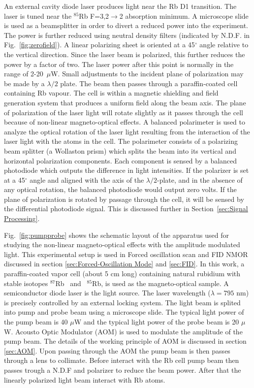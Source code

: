   An external cavity diode laser produces light near the Rb D1 transition.  The laser is tuned near the $^{85}$Rb F=3,2$\rightarrow$2 absorption minimum.  A microscope slide is used as a beamsplitter in order to divert a reduced power into the experiment.  The power is further reduced using neutral density filters (indicated by N.D.F. in Fig.~\ref{fig:zerofield}).  A linear polarizing sheet is oriented at a 45$^\circ$ angle relative to the vertical direction.  Since the laser
beam is polarized, this further reduces the power by a factor of two. The laser power after this point is normally in the range of 2-20~$\mu$W.  Small adjustments to the incident plane of polarization may be made by a $\lambda/2$ plate.  The beam then passes through a paraffin-coated cell containing Rb vapour.  The cell is within a
magnetic shielding and field generation system that produces a uniform field along the beam axis.  The plane of polarization of the laser
light will rotate slightly as it passes through the cell because of
non-linear magneto-optical effects.  A balanced polarimeter is used to
analyze the optical rotation of the laser light resulting from the
interaction of the laser light with the atoms in the cell.  The
polarimeter consists of a polarizing beam splitter (a Wollaston prism)
which splits the beam into its vertical and horizontal polarization
components.  Each component is sensed by a balanced photodiode which
outputs the difference in light intensities.  If the polarizer is set
at a 45$^\circ$ angle and aligned with the axis of the
$\lambda/2$-plate, and in the absence of any optical rotation, the
balanced photodiode would output zero volts.  If the plane of
polarization is rotated by passage through the cell, it will be sensed
 by the differential photodiode signal.  This is discussed further in Section~\ref{sec:Signal Processing}.
 
 Fig.~\ref{fig:pumpprobe}  shows the schematic layout of the apparatus used for studying the
non-linear magneto-optical effects with the amplitude modulated
light. This experimental setup is used in Forced oscillation scan and FID NMOR discussed in section \ref{sec:Forced-Oscillation Mode} and \ref{sec:FID}. In this work, a paraffin-coated vapor cell (about 5 cm long)
containing natural rubidium with stable isotopes $^{87}$Rb~ and~
$^{85}$Rb, is used as the magneto-optical sample. A semiconductor diode laser is the light source. The laser
wavelength ($\lambda=795$ nm) is precisely controlled by an external locking system.  The light beam is splited into pump and
probe beam using a microscope slide. The typical light power of the pump
beam is 40 $\mu$W and the typical light power of the probe beam is 20
$\mu$W.  Acousto Optic Modulator (AOM) is used to modulate the amplitude of the pump beam. The details of the working principle of AOM is discussed in section \ref{sec:AOM}. Upon passing through the AOM the pump beam is then passes through a lens to collimate. Before interact with the Rb cell pump beam then passes trough a N.D.F and polarizer to reduce the beam power. After that the linearly polarized light beam interact with Rb
atoms. 

